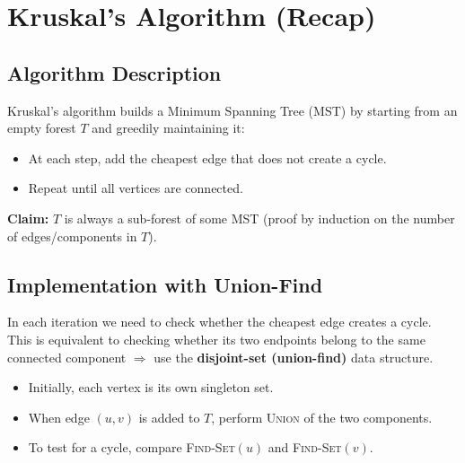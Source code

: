 
\section*{Kruskal's Algorithm (Recap)}

\subsection{Algorithm Description}

Kruskal's algorithm builds a Minimum Spanning Tree (MST) by starting from an empty forest $T$ and
greedily maintaining it:

\begin{itemize}[noitemsep]
  \item At each step, add the cheapest edge that does not create a cycle.
  \item Repeat until all vertices are connected.
\end{itemize}

\textbf{Claim:} $T$ is always a sub-forest of some MST (proof by induction on the number of
edges/components in $T$).

\subsection{Implementation with Union-Find}

In each iteration we need to check whether the cheapest edge creates a cycle.
This is equivalent to checking whether its two endpoints belong to the same connected component
$\Rightarrow$ use the \textbf{disjoint-set (union-find)} data structure.

\begin{itemize}[noitemsep]
  \item Initially, each vertex is its own singleton set.
  \item When edge $(u, v)$ is added to $T$, perform \textsc{Union} of the two components.
  \item To test for a cycle, compare \textsc{Find-Set}$(u)$ and \textsc{Find-Set}$(v)$.
\end{itemize}

